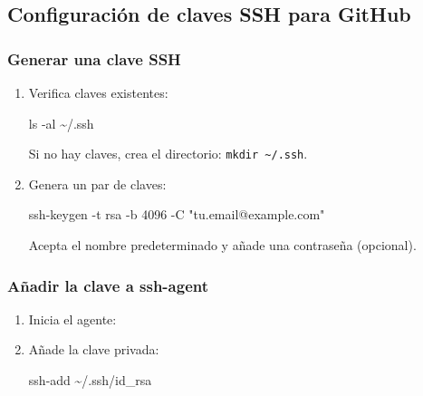 \documentclass[
  doc,
  floatsintext,
  longtable,
  a4paper,
  nolmodern,
  notxfonts,
  notimes,
  12pt,
  colorlinks=true,linkcolor=blue,citecolor=blue,urlcolor=blue]{apa7}
\newenvironment{Shaded}{\begin{snugshade}}{\end{snugshade}}
\newcommand{\AttributeTok}[1]{\textcolor[rgb]{0.40,0.45,0.13}{#1}}
\newcommand{\BuiltInTok}[1]{\textcolor[rgb]{0.00,0.23,0.31}{#1}}
\newcommand{\FunctionTok}[1]{\textcolor[rgb]{0.28,0.35,0.67}{#1}}
\newcommand{\NormalTok}[1]{\textcolor[rgb]{0.00,0.23,0.31}{#1}}
\newcommand{\StringTok}[1]{\textcolor[rgb]{0.13,0.47,0.30}{#1}}
\newcommand{\VariableTok}[1]{\textcolor[rgb]{0.07,0.07,0.07}{#1}}
\begin{document}
\subsection{Configuración de claves SSH para
GitHub}\label{configuraciuxf3n-de-claves-ssh-para-github}

\subsubsection{Generar una clave SSH}\label{generar-una-clave-ssh}

\begin{enumerate}
\def\labelenumi{\arabic{enumi}.}
\item
  Verifica claves existentes:

\begin{Shaded}
\begin{Highlighting}[]
\FunctionTok{ls} \AttributeTok{{-}al}\NormalTok{ \textasciitilde{}/.ssh}
\end{Highlighting}
\end{Shaded}

  Si no hay claves, crea el directorio:
  \texttt{mkdir\ \textasciitilde{}/.ssh}.
\item
  Genera un par de claves:

\begin{Shaded}
\begin{Highlighting}[]
\FunctionTok{ssh{-}keygen} \AttributeTok{{-}t}\NormalTok{ rsa }\AttributeTok{{-}b}\NormalTok{ 4096 }\AttributeTok{{-}C} \StringTok{"tu.email@example.com"}
\end{Highlighting}
\end{Shaded}

  Acepta el nombre predeterminado y añade una contraseña (opcional).
\end{enumerate}

\subsubsection{Añadir la clave a
ssh-agent}\label{auxf1adir-la-clave-a-ssh-agent}

\begin{enumerate}
\def\labelenumi{\arabic{enumi}.}
\item
  Inicia el agente:

\begin{Shaded}
\end{Shaded}
\item
  Añade la clave privada:

\begin{Shaded}
\begin{Highlighting}[]
\FunctionTok{ssh{-}add}\NormalTok{ \textasciitilde{}/.ssh/id\_rsa}
\end{Highlighting}
\end{Shaded}
\end{enumerate}
\end{document}
